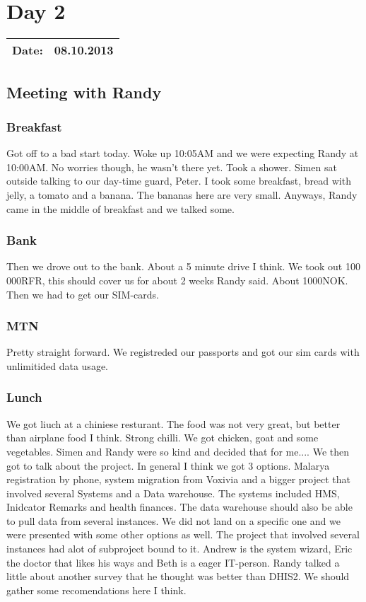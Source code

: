 \section{Day 2}
\begin{tabular}{|c|c|}
\hline
Date: & 08.10.2013 \\
\hline
\end{tabular}
\subsection{Meeting with Randy}
\subsubsection{Breakfast}
Got off to a bad start today. Woke up 10:05AM and we were expecting Randy at 10:00AM. No worries though, he wasn't there yet.
Took a shower. Simen sat outside talking to our day-time guard, Peter.
I took some breakfast, bread with jelly, a tomato and a banana. The bananas here are very small. Anyways, Randy came in the middle of breakfast and we talked some.
\subsubsection{Bank}
Then we drove out to the bank. About a 5 minute drive I think. We took out 100 000RFR, this should cover us for about 2 weeks Randy said. About 1000NOK.
Then we had to get our SIM-cards.
\subsubsection{MTN}
Pretty straight forward. We registreded our passports and got our sim cards with unlimitided data usage.
\subsubsection{Lunch}
We got liuch at a chiniese resturant. The food was not very great, but better than airplane food I think. Strong chilli. We got chicken, goat and some vegetables.
Simen and Randy were so kind and decided that for me.... 
We then got to talk about the project. In general I think we got 3 options.
Malarya registration by phone, system migration from Voxivia and a bigger project that involved several Systems and a Data warehouse.
The systems included HMS, Inidcator Remarks and health finances. The data warehouse should also be able to pull data from several instances.
We did not land on a specific one and we were presented with some other options as well.
The project that involved several instances had alot of subproject bound to it.
Andrew is the system wizard, Eric the doctor that likes his ways and Beth is a eager IT-person.
Randy talked a little about another survey that he thought was better than DHIS2. We should gather some recomendations here I think.
